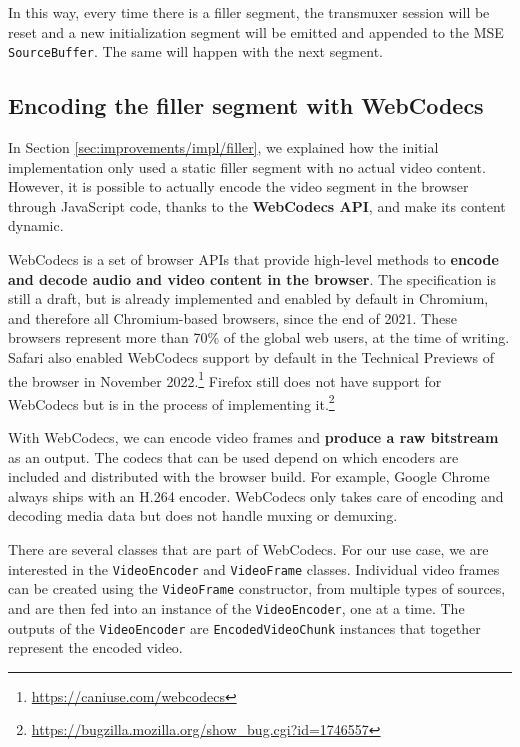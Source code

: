 In this way, every time there is a filler segment, the transmuxer session will be reset and a new initialization segment will be emitted and appended to the MSE \texttt{SourceBuffer}. The same will happen with the next segment.

\subsection{Encoding the filler segment with WebCodecs}
\label{sec:improvements/impl/webcodecs}

In Section \ref{sec:improvements/impl/filler}, we explained how the initial implementation only used a static filler segment with no actual video content. However, it is possible to actually encode the video segment in the browser through JavaScript code, thanks to the \textbf{WebCodecs API}, and make its content dynamic.

WebCodecs is a set of browser APIs that provide high-level methods to \textbf{encode and decode audio and video content in the browser}. The specification is still a draft, but is already implemented and enabled by default in Chromium, and therefore all Chromium-based browsers, since the end of 2021. These browsers represent more than 70\% of the global web users, at the time of writing. Safari also enabled WebCodecs support by default in the Technical Previews of the browser in November 2022.\footnote{\url{https://caniuse.com/webcodecs}} Firefox still does not have support for WebCodecs but is in the process of implementing it.\footnote{\url{https://bugzilla.mozilla.org/show_bug.cgi?id=1746557}}

With WebCodecs, we can encode video frames and \textbf{produce a raw bitstream} as an output. The codecs that can be used depend on which encoders are included and distributed with the browser build. For example, Google Chrome always ships with an H.264 encoder. WebCodecs only takes care of encoding and decoding media data but does not handle muxing or demuxing.

There are several classes that are part of WebCodecs. For our use case, we are interested in the \texttt{VideoEncoder} and \texttt{VideoFrame} classes. Individual video frames can be created using the \texttt{VideoFrame} constructor, from multiple types of sources, and are then fed into an instance of the \texttt{VideoEncoder}, one at a time. The outputs of the \texttt{VideoEncoder} are \texttt{EncodedVideoChunk} instances that together represent the encoded video.\cite{webcodecs}

